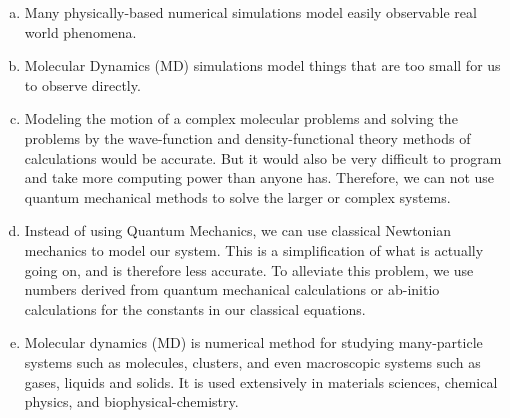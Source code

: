 \begin{enumerate}[(a)]
\item Many physically-based numerical simulations model easily observable real world phenomena.
\item Molecular Dynamics (MD) simulations model things that are too small for us to observe directly.
\item Modeling the motion of a complex molecular problems and solving the problems by  the 
wave-function and density-functional theory methods of calculations would be accurate. But it would also be very difficult to program and take more computing power than anyone has.  Therefore, we can not use quantum mechanical methods to solve the larger or complex systems. 
\item Instead of using Quantum Mechanics, we can use classical Newtonian mechanics to model our system.
This is a simplification of what is actually going on, and is therefore less accurate. To alleviate this problem, we use numbers derived from quantum mechanical calculations or ab-initio calculations for the constants in our classical equations.
\item  Molecular dynamics (MD) is  numerical method for studying many-particle systems such as molecules, clusters, and even macroscopic systems such as gases, liquids and solids. It is 
used extensively in materials sciences, chemical physics, and biophysical-chemistry.
\end{enumerate}

